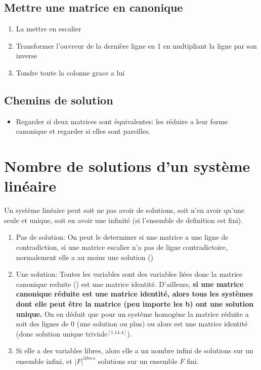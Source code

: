 \documentclass[12pt]{article}
\begin{document}
\subsection{Mettre une matrice en canonique}
\begin{enumerate}
  \item La mettre en escalier
  \item Transformer l'ouvreur de la dernière ligne en 1 en multipliant la ligne par son inverse
  \item Tondre toute la colonne grace a lui
\end{enumerate}
  

\subsection{Chemins de solution}
\begin{itemize}
  \item Regarder si deux matrices sont équivalentes: les réduire a leur forme canonique et regarder si elles sont pareilles. 
\end{itemize}

\section{Nombre de solutions d'un système linéaire}

Un système linéaire peut soit ne pas avoir de solutions, soit n'en avoir qu'une seule et unique, soit en avoir une infinité (si l'ensemble de definition est fini). 
\begin{enumerate}
  \item Pas de solution: On peut le determiner si une matrice a une ligne de contradiction, si une matrice escalier n'a pas de ligne contradictoire, normalement elle a au moins une solution ()
  \item Une solution: Toutes les variables sont des variables liées donc la matrice canonique reduite () est une matrice identité. D'ailleurs, \textbf{si une matrice canonique réduite est une matrice identité, alors tous les systèmes dont elle peut être la matrice (peu importe les b) ont une solution unique.} On en déduit que pour un système homogène la matrice réduite a soit des lignes de 0 (une solution ou plus) ou alors est une matrice identité (donc solution unique triviale$^{[1.14.4]}$).
    \item Si elle a des variables libres, alors elle a un nombre infini de solutions sur un ensemble infini, et $| F |^{libres}$ solutions sur un ensemble  $F$ fini.
\end{enumerate}


  
  
  
  
\end{document}
